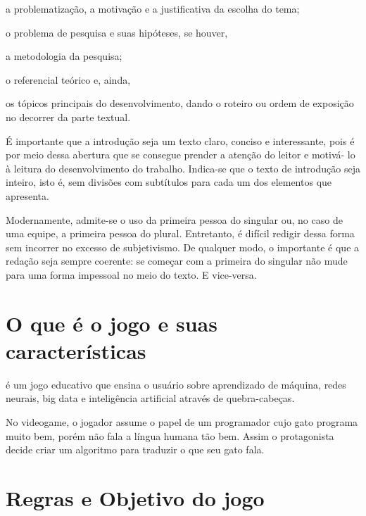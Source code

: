 \documentclass[12pt,oneside,a4paper,chapter=TITLE,section=TITLE,sumario
=tradicional]{abntex2}
\begin{document}
\begin{lista}
    \item a problematização, a motivação e a justificativa da escolha do tema;
    \item o problema de pesquisa e suas hipóteses, se houver,
    \item a metodologia da pesquisa;
    \item o referencial teórico e, ainda,
    \item os tópicos principais do desenvolvimento, dando o roteiro ou
    ordem de exposição no decorrer da parte textual.
\end{lista}

É importante que a introdução seja um texto claro, conciso e interessante, pois 
é por meio dessa abertura que se consegue prender a atenção do leitor e motivá- 
lo à leitura do desenvolvimento do trabalho. Indica-se que o texto de 
introdução seja inteiro, isto é, sem divisões com subtítulos para cada um dos 
elementos que apresenta.

Modernamente, admite-se o uso da primeira pessoa do singular ou, no caso de uma 
equipe, a primeira pessoa do plural. Entretanto, é difícil redigir dessa forma 
sem incorrer no excesso de subjetivismo. De qualquer modo, o importante é que a 
redação seja sempre coerente: se começar com a primeira do singular não mude 
para uma forma impessoal no meio do texto. E vice-versa.

\chapter{O que é o jogo e suas características}
\label{cap:o-que-eh-o-jogo-e-suas-caracteristicas}

 é um jogo educativo que ensina o usuário sobre aprendizado de máquina, redes neurais, big data e inteligência artificial através de quebra-cabeças.

No videogame, o jogador assume o papel de um programador cujo gato programa muito bem, porém não fala a língua humana tão bem. Assim o protagonista decide criar um algoritmo para traduzir o que seu gato fala.

\chapter{Regras e Objetivo do jogo}
\label{cap:regras-e-objetivo-do-jogo}
\end{document}
